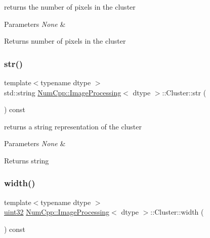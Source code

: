 returns the number of pixels in the cluster


\begin{DoxyParams}{Parameters}
{\em None} & \\
\hline
\end{DoxyParams}
\begin{DoxyReturn}{Returns}
number of pixels in the cluster 
\end{DoxyReturn}
\mbox{\label{class_num_cpp_1_1_image_processing_1_1_cluster_a92406c7e147b2a3e649f30ce40f5a53f}} 
\subsubsection{\texorpdfstring{str()}{str()}}
{\footnotesize\ttfamily template$<$typename dtype $>$ \\
std\+::string \mbox{\hyperlink{class_num_cpp_1_1_image_processing}{Num\+Cpp\+::\+Image\+Processing}}$<$ dtype $>$\+::Cluster\+::str (\begin{DoxyParamCaption}{ }\end{DoxyParamCaption}) const\hspace{0.3cm}{\ttfamily [inline]}}

returns a string representation of the cluster


\begin{DoxyParams}{Parameters}
{\em None} & \\
\hline
\end{DoxyParams}
\begin{DoxyReturn}{Returns}
string 
\end{DoxyReturn}
\mbox{\label{class_num_cpp_1_1_image_processing_1_1_cluster_a799065eaa2e5cf4244caadd2c80b6f39}} 
\subsubsection{\texorpdfstring{width()}{width()}}
{\footnotesize\ttfamily template$<$typename dtype $>$ \\
\mbox{\hyperlink{namespace_num_cpp_a36f388e948380413c63011cab9b7fbd5}{uint32}} \mbox{\hyperlink{class_num_cpp_1_1_image_processing}{Num\+Cpp\+::\+Image\+Processing}}$<$ dtype $>$\+::Cluster\+::width (\begin{DoxyParamCaption}{ }\end{DoxyParamCaption}) const\hspace{0.3cm}{\ttfamily [inline]}}

